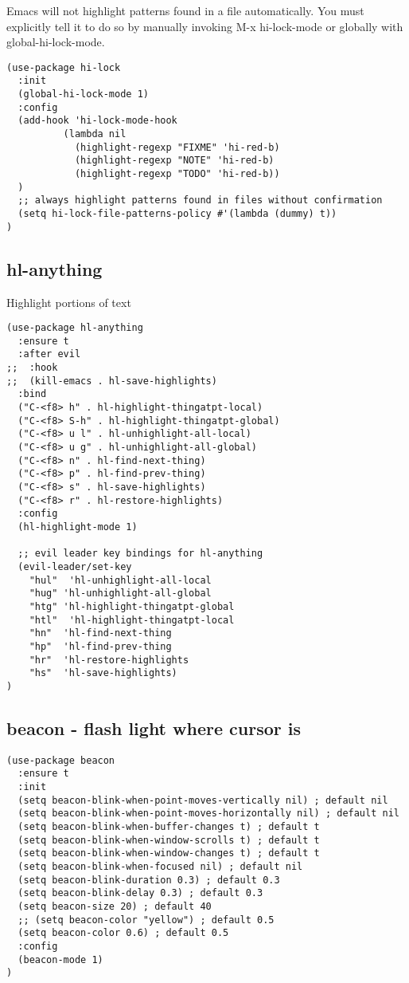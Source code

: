 \documentclass[11pt]{article}
\begin{document}
Emacs will not highlight patterns found in a file automatically. You must explicitly tell it to do so by manually invoking M-x hi-lock-mode or globally with global-hi-lock-mode.

\begin{verbatim}
(use-package hi-lock
  :init
  (global-hi-lock-mode 1)
  :config
  (add-hook 'hi-lock-mode-hook
          (lambda nil
            (highlight-regexp "FIXME" 'hi-red-b)
            (highlight-regexp "NOTE" 'hi-red-b)
            (highlight-regexp "TODO" 'hi-red-b))
  )
  ;; always highlight patterns found in files without confirmation
  (setq hi-lock-file-patterns-policy #'(lambda (dummy) t))
)
\end{verbatim}

\subsection*{hl-anything}
\label{sec:orga408c36}

Highlight portions of text

\begin{verbatim}
(use-package hl-anything
  :ensure t
  :after evil
;;  :hook
;;  (kill-emacs . hl-save-highlights)
  :bind
  ("C-<f8> h" . hl-highlight-thingatpt-local)
  ("C-<f8> S-h" . hl-highlight-thingatpt-global)
  ("C-<f8> u l" . hl-unhighlight-all-local)
  ("C-<f8> u g" . hl-unhighlight-all-global)
  ("C-<f8> n" . hl-find-next-thing)
  ("C-<f8> p" . hl-find-prev-thing)
  ("C-<f8> s" . hl-save-highlights)
  ("C-<f8> r" . hl-restore-highlights)
  :config
  (hl-highlight-mode 1)

  ;; evil leader key bindings for hl-anything
  (evil-leader/set-key
    "hul"  'hl-unhighlight-all-local
    "hug" 'hl-unhighlight-all-global
    "htg" 'hl-highlight-thingatpt-global
    "htl"  'hl-highlight-thingatpt-local
    "hn"  'hl-find-next-thing
    "hp"  'hl-find-prev-thing
    "hr"  'hl-restore-highlights
    "hs"  'hl-save-highlights)
)
\end{verbatim}

\subsection*{beacon - flash light where cursor is}
\label{sec:org3d91ae5}
\begin{verbatim}
(use-package beacon
  :ensure t
  :init
  (setq beacon-blink-when-point-moves-vertically nil) ; default nil
  (setq beacon-blink-when-point-moves-horizontally nil) ; default nil
  (setq beacon-blink-when-buffer-changes t) ; default t
  (setq beacon-blink-when-window-scrolls t) ; default t
  (setq beacon-blink-when-window-changes t) ; default t
  (setq beacon-blink-when-focused nil) ; default nil
  (setq beacon-blink-duration 0.3) ; default 0.3
  (setq beacon-blink-delay 0.3) ; default 0.3
  (setq beacon-size 20) ; default 40
  ;; (setq beacon-color "yellow") ; default 0.5
  (setq beacon-color 0.6) ; default 0.5
  :config
  (beacon-mode 1)
)
\end{verbatim}
\end{document}
